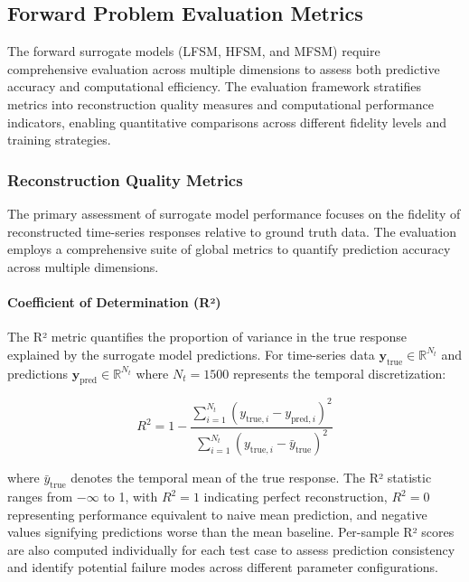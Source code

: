\documentclass[12pt,a4paper]{report}
\begin{document}
\subsection{Forward Problem Evaluation Metrics}

The forward surrogate models (LFSM, HFSM, and MFSM) require comprehensive evaluation across multiple dimensions to assess both predictive accuracy and computational efficiency. The evaluation framework stratifies metrics into reconstruction quality measures and computational performance indicators, enabling quantitative comparisons across different fidelity levels and training strategies.

\subsubsection{Reconstruction Quality Metrics}

The primary assessment of surrogate model performance focuses on the fidelity of reconstructed time-series responses relative to ground truth data. The evaluation employs a comprehensive suite of global metrics to quantify prediction accuracy across multiple dimensions.

\paragraph{Coefficient of Determination (R²)} The R² metric quantifies the proportion of variance in the true response explained by the surrogate model predictions. For time-series data $\mathbf{y}_{\text{true}} \in \mathbb{R}^{N_t}$ and predictions $\mathbf{y}_{\text{pred}} \in \mathbb{R}^{N_t}$ where $N_t = 1500$ represents the temporal discretization:

\begin{equation}
R^2 = 1 - \frac{\sum_{i=1}^{N_t} (y_{\text{true},i} - y_{\text{pred},i})^2}{\sum_{i=1}^{N_t} (y_{\text{true},i} - \bar{y}_{\text{true}})^2}
\end{equation}

where $\bar{y}_{\text{true}}$ denotes the temporal mean of the true response. The R² statistic ranges from $-\infty$ to 1, with $R^2 = 1$ indicating perfect reconstruction, $R^2 = 0$ representing performance equivalent to naive mean prediction, and negative values signifying predictions worse than the mean baseline. Per-sample R² scores are also computed individually for each test case to assess prediction consistency and identify potential failure modes across different parameter configurations.
\end{document}
